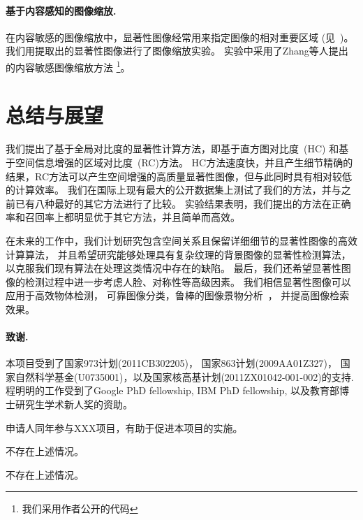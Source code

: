 \documentclass[12pt,singlecolumn,letterpaper]{article}
\newcommand{\mypara}[1]{\paragraph{#1.}}
\begin{document}
\mypara{基于内容感知的图像缩放}
在内容敏感的图像缩放中，显著性图像经常用来指定图像的相对重要区域
(见~\cite{09_image_resize})。
我们用提取出的显著性图像进行了图像缩放实验。
实验中采用了Zhang等人提出的\cite{09cgf/ZhangC}内容敏感图像缩放方法
\footnote{我们采用作者公开的代码}。

{\small


}



\section{总结与展望}\label{sec:Conclusion}
我们提出了基于全局对比度的显著性计算方法，即基于直方图对比度~(HC) 和基于空间信息增强的区域对比度~(RC)方法。
HC方法速度快，并且产生细节精确的结果，RC方法可以产生空间增强的高质量显著性图像，但与此同时具有相对较低的计算效率。
我们在国际上现有最大的公开数据集上测试了我们的方法，并与之前已有八种最好的其它方法进行了比较。
实验结果表明，我们提出的方法在正确率和召回率上都明显优于其它方法，并且简单而高效。

在未来的工作中，我们计划研究包含空间关系且保留详细细节的显著性图像的高效计算算法，
并且希望研究能够处理具有复杂纹理的背景图像的显著性检测算法，
以克服我们现有算法在处理这类情况中存在的缺陷。
最后，我们还希望显著性图像的检测过程中进一步考虑人脸、对称性等高级因素。
我们相信显著性图像可以应用于高效物体检测\cite{06TCSVT/han_unsupervised}，
可靠图像分类，鲁棒的图像景物分析~\cite{journal/tog/ChengZMHH10}，
并提高图像检索效果\cite{tog09/ChenCT_Sketch2Photo}。


\paragraph{致谢.} 本项目受到了国家973计划(2011CB302205)， 国家863计划(2009AA01Z327)，
国家自然科学基金(U0735001)，以及国家核高基计划(2011ZX01042-001-002)的支持.
程明明的工作受到了Google PhD fellowship, IBM PhD fellowship, 以及教育部博士研究生学术新人奖的资助。



 
申请人同年参与XXX项目，有助于促进本项目的实施。


不存在上述情况。


不存在上述情况。

\end{document}
